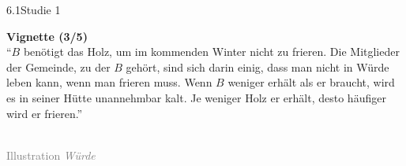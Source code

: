 \documentclass[xcolor=table,9pt,aspectratio=169]{beamer}
\begin{document}
\begin{frame}{\vspace*{10mm}6.1\hspace*{1em}Studie 1}
\begin{multicols}{2}
   \textbf{Vignette (3/5)}\\
   \medskip
   \enquote{$B$ benötigt das Holz, um im kommenden Winter nicht zu frieren. Die Mitglieder der Gemeinde, zu der $B$ gehört, sind sich darin einig, dass man nicht in Würde leben kann, wenn man frieren muss. Wenn $B$ weniger erhält als er braucht, wird es in seiner Hütte unannehmbar kalt. Je weniger Holz er erhält, desto häufiger wird er frieren.}
   \vfill
   \begin{center}
      \\
      \textcolor{gray}{Illustration \textit{Würde}}
   \end{center}
\end{multicols}
\end{frame}
\end{document}
